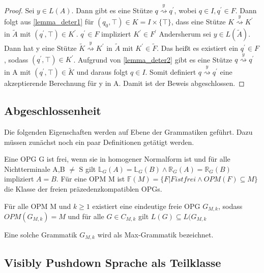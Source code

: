 \begin{proof}
Sei $y \in L(A)$. Dann gibt es eine Stütze $q \stackrel{y} {\rightsquigarrow} q^\prime$, wobei $q\in I, q^\prime \in F$. Dann folgt aus \autoref{lemma_deter1} für $(q_0, \top) \in K=I \times \{\top\}$, dass eine Stütze $K \stackrel{y}{\rightsquigarrow}K^\prime$ in $\tilde{A}$ mit $(q^\prime, \top) \in K^\prime $. $q^\prime \in F$ impliziert $K^\prime \in F^\prime$
Andersherum sei $y \in L(\tilde{A})$. Dann hat y eine Stütze $\tilde{K}\stackrel{y}{\rightsquigarrow}K^\prime$ in $\tilde{A}$ mit $K^\prime \in \tilde{F}$. Das heißt es existiert ein $q^\prime \in F$, sodass $(q^\prime, \top) \in K^\prime$. Aufgrund von \autoref{lemma_deter2} gibt es eine Stütze $q \stackrel{y} {\rightsquigarrow} q^\prime$ in A mit $(q^\prime, \top) \in \tilde{K}$ und daraus folgt $q \in I$. Somit definiert $q\stackrel{y}{\rightsquigarrow}q^\prime$ eine akzeptierende Berechnung für y in A.
Damit ist der Beweis abgeschlossen. 
\end{proof}
\subsection{Abgeschlossenheit}
Die folgenden Eigenschaften werden auf Ebene der Grammatiken geführt. Dazu müssen zunächst noch ein paar Definitionen getätigt werden.
\begin{definition}
Eine OPG G ist frei, wenn sie in homogener Normalform ist und für alle Nichtterminale A,B $\neq$ S gilt $\mathbb{L}_G(A) = \mathbb{L}_G(B) \wedge \mathbb{R}_G(A)=\mathbb{R}_G(B)$ impliziert $A=B$. Für eine OPM M ist $\mathbb{F}(M)=\{F|F ist frei \wedge OPM(F) \subseteq M\}$ die Klasse der freien präzedenzkompatiblen OPGs.
\end{definition}

\begin{lemma}
Für alle OPM M und $k \geq 1$ existiert eine eindeutige freie OPG $G_{M,k}$, sodass $OPM(G_{M,k})=M$ und für alle $G \in C_{M,k}$ gilt $L(G)\subseteq L(G_{M,k}$
\end{lemma}
Eine solche Grammatik $G_{M,k}$ wird als Max-Grammatik bezeichnet.
\subsection{Visibly Pushdown Sprache als Teilklasse}